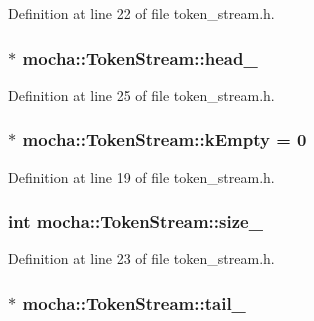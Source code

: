 Definition at line 22 of file token\_\-stream.h.

\hypertarget{classmocha_1_1_token_stream_a931a79234762ef220bc3e887a0426721}{
\subsubsection[{head\_\-}]{$\ast$ {\bf mocha::TokenStream::head\_\-}}}
\label{classmocha_1_1_token_stream_a931a79234762ef220bc3e887a0426721}


Definition at line 25 of file token\_\-stream.h.

\hypertarget{classmocha_1_1_token_stream_ae15de3402e95397fd58b6efa49f08d42}{
\subsubsection[{kEmpty}]{ $\ast$ {\bf mocha::TokenStream::kEmpty} = 0}}
\label{classmocha_1_1_token_stream_ae15de3402e95397fd58b6efa49f08d42}


Definition at line 19 of file token\_\-stream.h.

\hypertarget{classmocha_1_1_token_stream_a0a7f30870a65e8bc87cb435ca366ea52}{
\subsubsection[{size\_\-}]{\setlength{\rightskip}{0pt plus 5cm}int {\bf mocha::TokenStream::size\_\-}}}
\label{classmocha_1_1_token_stream_a0a7f30870a65e8bc87cb435ca366ea52}


Definition at line 23 of file token\_\-stream.h.

\hypertarget{classmocha_1_1_token_stream_a478d6cb07f735082f7cf55a86d6addc2}{
\subsubsection[{tail\_\-}]{$\ast$ {\bf mocha::TokenStream::tail\_\-}}}
\label{classmocha_1_1_token_stream_a478d6cb07f735082f7cf55a86d6addc2}



